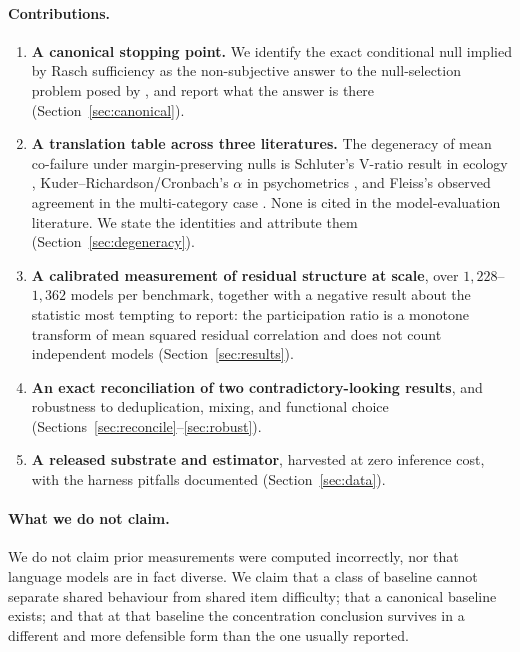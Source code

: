 \documentclass[pdflatex,sn-mathphys-ay]{sn-jnl}
\theoremstyle{thmstyleone}
\theoremstyle{thmstylethree}
\begin{document}
\paragraph{Contributions.}
\begin{enumerate}
\item \textbf{A canonical stopping point.} We identify the exact conditional null implied by
Rasch sufficiency as the non-subjective answer to the null-selection problem posed by
\citet{jo2026subjectivity}, and report what the answer is there
(Section~\ref{sec:canonical}).
\item \textbf{A translation table across three literatures.} The degeneracy of mean co-failure
under margin-preserving nulls is Schluter's V-ratio result in ecology
\citep{schluter1984,gotelli2000,gotelliulrich2012}, Kuder--Richardson/Cronbach's $\alpha$ in
psychometrics \citep{kuder1937,cronbach1951}, and Fleiss's observed agreement in the
multi-category case \citep{fleiss1971}. None is cited in the model-evaluation literature. We
state the identities and attribute them (Section~\ref{sec:degeneracy}).
\item \textbf{A calibrated measurement of residual structure at scale}, over
$1{,}228$--$1{,}362$ models per benchmark, together with a negative result about the statistic
most tempting to report: the participation ratio is a monotone transform of mean squared
residual correlation and does not count independent models (Section~\ref{sec:results}).
\item \textbf{An exact reconciliation of two contradictory-looking results}, and robustness to
deduplication, mixing, and functional choice (Sections~\ref{sec:reconcile}--\ref{sec:robust}).
\item \textbf{A released substrate and estimator}, harvested at zero inference cost, with the
harness pitfalls documented (Section~\ref{sec:data}).
\end{enumerate}

\paragraph{What we do not claim.} We do not claim prior measurements were computed incorrectly,
nor that language models are in fact diverse. We claim that a class of baseline cannot separate
shared behaviour from shared item difficulty; that a canonical baseline exists; and that at that
baseline the concentration conclusion survives in a different and more defensible form than the
one usually reported.
\end{document}
